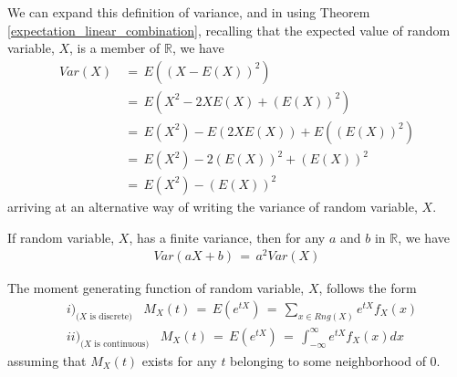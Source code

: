 We can expand this definition of variance, and in using Theorem \ref{expectation_linear_combination}, recalling that the expected value of random variable, $X$, is a member of $\mathbb{R}$, we have
\begin{align*}
    Var(X) \hspace{2pt} &= \hspace{2pt} E((X - E(X))^{2}) \\[1ex]
    &= \hspace{2pt} E(X^{2} - 2XE(X) + (E(X))^{2}) \\[1ex]
    &= \hspace{2pt} E(X^{2}) - E(2XE(X)) + E((E(X))^{2}) \\[1ex]
    &= \hspace{2pt} E(X^{2}) - 2(E(X))^{2} + (E(X))^{2} \\[1ex]
    &= \hspace{2pt} E(X^{2}) - (E(X))^{2}
\end{align*}
arriving at an alternative way of writing the variance of random variable, $X$.

\begin{theorem}
    If random variable, $X$, has a finite variance, then for any $a$ and $b$ in $\mathbb{R}$, we have
    \begin{align*}
        Var(aX + b) \hspace{2pt} = \hspace{2pt} a^{2}Var(X)
    \end{align*}
\end{theorem}

\begin{definition}
    The moment generating function of random variable, $X$, follows the form
    \begin{align*}
        &i)_\text{($X$ is discrete)} \hspace{10pt} M_{X}(t) \hspace{2pt} = \hspace{2pt} E(e^{tX}) \hspace{2pt} = \hspace{2pt} \sum_{x \in Rng(X)} e^{tX}f_{X}(x) \\[2ex]
        &ii)_\text{($X$ is continuous)} \hspace{10pt} M_{X}(t) \hspace{2pt} = \hspace{2pt} E(e^{tX}) \hspace{2pt} = \hspace{2pt} \int_{-\infty}^{\infty} e^{tX}f_{X}(x)dx
    \end{align*}
assuming that $M_{X}(t)$ exists for any $t$ belonging to some neighborhood of $0$.
\end{definition}

